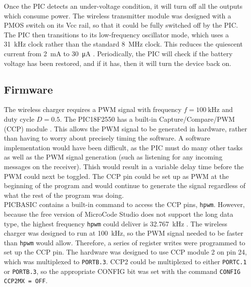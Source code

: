 Once the PIC detects an under-voltage condition, it will turn off all the outputs which consume power. The wireless transmitter module was designed with a PMOS switch on its Vcc rail, so that it could be fully switched off by the PIC. The PIC then transitions to its low-frequency oscillator mode, which uses a \SI{31}{\kilo\hertz} clock rather than the standard \SI{8}{\mega\hertz} clock. This reduces the quiescent current from \SI{2}{\milli\ampere} to \SI{30}{\micro\ampere} \cite{pic16f688}. Periodically, the PIC will check if the battery voltage has been restored, and if it has, then it will turn the device back on.
 



\subsection{Firmware}
The wireless charger requires a PWM signal with frequency $f=\SI{100}{\kilo\hertz}$ and duty cycle $D=0.5$. The PIC18F2550 has a built-in Capture/Compare/PWM (CCP) module \cite{pic18f2550}. This allows the PWM signal to be generated in hardware, rather than having to worry about precisely timing the software. A software implementation would have been difficult, as the PIC must do many other tasks as well as the PWM signal generation (such as listening for any incoming messages on the receiver). Thish would result in a variable delay time before the PWM could next be toggled. The CCP pin could be set up as PWM at the beginning of the program and would continue to generate the signal regardless of what the rest of the program was doing.\\

PICBASIC contains a built-in command to access the CCP pins, \verb|hpwm|. However, because the free version of MicroCode Studio does not support the long data type, the highest frequency \verb|hpwm| could deliver is \SI{32.767}{\kilo\hertz} \cite{picbasic_pro}. The wireless charger was designed to run at \SI{100}{\kilo\hertz}, so the PWM signal needed to be faster than \verb|hpwm| would allow. Therefore, a series of register writes were programmed to set up the CCP pin. The hardware was designed to use CCP module 2 on pin 24, which was multiplexed to \verb|PORTB.3|. CCP2 could be multiplexed to either \verb|PORTC.1| or \verb|PORTB.3|, so the appropriate CONFIG bit was set with the command \verb|CONFIG CCP2MX = OFF|.\\

